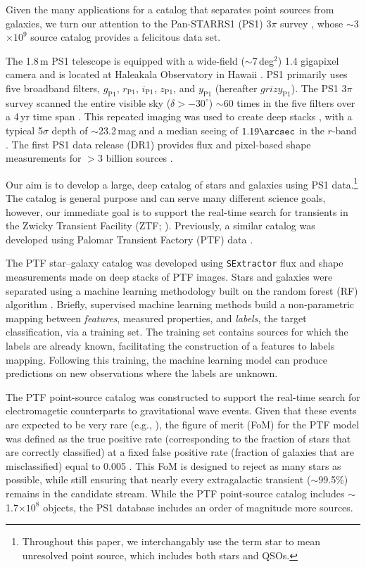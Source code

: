 \documentclass[twocolumn]{aastex62}
\begin{document}
Given the many applications for a catalog that separates point sources from
galaxies, we turn our attention to the Pan-STARRS1 (PS1) 3$\pi$ survey
\citep{Chambers16}, whose $\sim$3$\times 10^{9}$ source catalog provides a
felicitous data set.

The 1.8\,m PS1 telescope is equipped with a wide-field ($\sim$7\,deg$^2$)
1.4 gigapixel camera and is located at Haleakala Observatory in Hawaii
\citep{Hodapp04}. PS1 primarily uses five broadband filters,
$g_{\mathrm{P1}}$, $r_{\mathrm{P1}}$, $i_{\mathrm{P1}}$, $z_{\mathrm{P1}}$,
and $y_{\mathrm{P1}}$ (hereafter $grizy_{\mathrm{P1}}$). The PS1 3$\pi$
survey scanned the entire visible sky ($\delta > -30^\circ$) $\sim$60 times
in the five filters over a 4\,yr time span \citep{Chambers16}. This
repeated imaging was used to create deep stacks \citep{Magnier16b}, with a
typical 5$\sigma$ depth of $\sim$23.2\,mag and a median seeing of
$1.19\arcsec$ in the $r$-band \citep{Tonry12, Schlafly12, Chambers16}. The
first PS1 data release (DR1) provides flux and pixel-based shape
measurements for $>$3 billion sources \citep{Flewelling16}.

Our aim is to develop a large, deep catalog of stars and galaxies using PS1
data.\footnote{Throughout this paper, we interchangably use the term star to
mean unresolved point source, which includes both stars and QSOs.} The
catalog is general purpose and can serve many different science goals,
however, our immediate goal is to support the real-time search for
transients in the Zwicky Transient Facility (ZTF; \citealt{Bellm:18:ZTF}).
Previously, a similar catalog was developed using Palomar Transient Factory
(PTF) data \citep{Miller17}.

The PTF star--galaxy catalog was developed using \texttt{SExtractor}
\citep{bertin96} flux and shape measurements made on deep stacks of PTF
images. Stars and galaxies were separated using a machine learning
methodology built on the random forest (RF) algorithm \citep{Breiman01}.
Briefly, supervised machine learning methods build a non-parametric mapping
between \textit{features}, measured properties, and \textit{labels}, the
target classification, via a training set. The training set contains sources
for which the labels are already known, facilitating the construction of a
features to labels mapping. Following this training, the machine learning
model can produce predictions on new observations where the labels are
unknown.

The PTF point-source catalog was constructed to support the real-time search
for electromagetic counterparts to gravitational wave events. Given that
these events are expected to be very rare (e.g., \citealt{Scolnic18}), the
figure of merit (FoM) for the PTF model was defined as the true positive
rate (corresponding to the fraction of stars that are correctly classified)
at a fixed false positive rate (fraction of galaxies that are misclassified)
equal to 0.005 \citep{Miller17}. This FoM is designed to reject as many
stars as possible, while still ensuring that nearly every extragalactic
transient ($\sim$99.5\%) remains in the candidate stream. While the PTF
point-source catalog includes $\sim$1.7$\times 10^8$ objects, the PS1
database includes an order of magnitude more sources.
\end{document}

